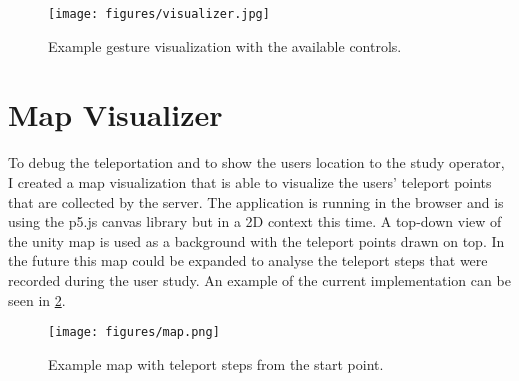 \begin{figure}[!ht]
    \centering
    \texttt{[image: figures/visualizer.jpg]}
    \caption{Example gesture visualization with the available controls.}
    \label{fig:vis}
\end{figure}


\section{Map Visualizer}
To debug the teleportation and to show the users location to the study operator, I created a map visualization that is able to visualize the users' teleport points that are collected by the server. The application is running in the browser and is using the p5.js canvas library but in a 2D context this time. A top-down view of the unity map is used as a background with the teleport points drawn on top. In the future this map could be expanded to analyse the teleport steps that were recorded during the user study. An example of the current implementation can be seen in \ref{fig:map}.

\begin{figure}[!ht]
    \centering
    \texttt{[image: figures/map.png]}
    \caption{Example map with teleport steps from the start point.}
    \label{fig:map}
\end{figure}
